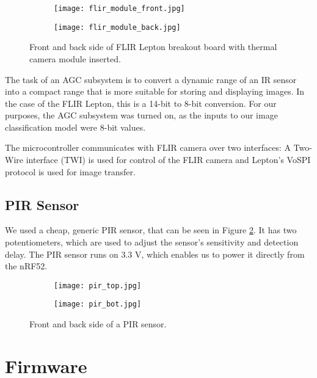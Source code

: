 \begin{figure}[ht] 
    \begin{subfigure}[b]{0.5\textwidth}
        \centering
        \texttt{[image: flir\_module\_front.jpg]} 
    \end{subfigure}
    \begin{subfigure}[b]{0.5\textwidth}
        \centering
        \texttt{[image: flir\_module\_back.jpg]} 
    \end{subfigure}
    \caption{ Front and back side of FLIR Lepton breakout board with thermal camera module inserted.}
    \label{lepton_breakout}
\end{figure}

The task of an AGC subsystem is to convert a dynamic range of an IR sensor into a compact range that is more suitable for storing and displaying images.
In the case of the FLIR Lepton, this is a 14-bit to 8-bit conversion.
For our purposes, the AGC subsystem was turned on, as the inputs to our image classification model were 8-bit values.

The microcontroller communicates with FLIR camera over two interfaces: A Two-Wire interface (TWI) is used for control of the FLIR camera and Lepton's VoSPI protocol is used for image transfer.

\subsection{ PIR Sensor}

We used a cheap, generic PIR sensor, that can be seen in Figure \ref{pir_sensor}.
It has two potentiometers, which are used to adjust the sensor's sensitivity and detection delay.
The PIR sensor runs on 3.3 V, which enables us to power it directly from the nRF52. 
\newline
\begin{figure}[ht] 
    \begin{subfigure}[b]{0.5\textwidth}
        \centering
        \texttt{[image: pir\_top.jpg]} 
    \end{subfigure}
    \begin{subfigure}[b]{0.5\textwidth}
        \centering
        \texttt{[image: pir\_bot.jpg]} 
    \end{subfigure}
    \caption{ Front and back side of a PIR sensor.}
    \label{pir_sensor}
\end{figure}

\section{ Firmware}
